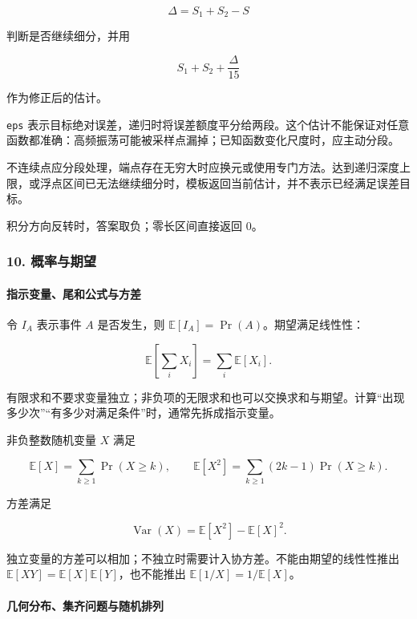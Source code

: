\[
\Delta=S_1+S_2-S
\]

判断是否继续细分，并用

\[
S_1+S_2+\frac{\Delta}{15}
\]

作为修正后的估计。

\passthrough{\lstinline!eps!} 表示目标绝对误差，递归时将误差额度平分给两段。这个估计不能保证对任意函数都准确：高频振荡可能被采样点漏掉；已知函数变化尺度时，应主动分段。

不连续点应分段处理，端点存在无穷大时应换元或使用专门方法。达到递归深度上限，或浮点区间已无法继续细分时，模板返回当前估计，并不表示已经满足误差目标。

积分方向反转时，答案取负；零长区间直接返回 \(0\)。

\hypertarget{ux6982ux7387ux4e0eux671fux671b}{%
\subsubsection{10. 概率与期望}\label{ux6982ux7387ux4e0eux671fux671b}}

\hypertarget{ux6307ux793aux53d8ux91cfux5c3eux548cux516cux5f0fux4e0eux65b9ux5dee}{%
\paragraph{指示变量、尾和公式与方差}\label{ux6307ux793aux53d8ux91cfux5c3eux548cux516cux5f0fux4e0eux65b9ux5dee}}

令 \(I_A\) 表示事件 \(A\) 是否发生，则 \(\mathbb E[I_A]=\Pr(A)\)。期望满足线性性：

\[
\mathbb E\!\left[\sum_i X_i\right]=\sum_i\mathbb E[X_i].
\]

有限求和不要求变量独立；非负项的无限求和也可以交换求和与期望。计算``出现多少次''``有多少对满足条件''时，通常先拆成指示变量。

非负整数随机变量 \(X\) 满足

\[
\mathbb E[X]=\sum_{k\ge1}\Pr(X\ge k),\qquad
\mathbb E[X^2]=\sum_{k\ge1}(2k-1)\Pr(X\ge k).
\]

方差满足

\[
\operatorname{Var}(X)=\mathbb E[X^2]-\mathbb E[X]^2.
\]

独立变量的方差可以相加；不独立时需要计入协方差。不能由期望的线性性推出 \(\mathbb E[XY]=\mathbb E[X]\mathbb E[Y]\)，也不能推出 \(\mathbb E[1/X]=1/\mathbb E[X]\)。

\hypertarget{ux51e0ux4f55ux5206ux5e03ux96c6ux9f50ux95eeux9898ux4e0eux968fux673aux6392ux5217}{%
\paragraph{几何分布、集齐问题与随机排列}\label{ux51e0ux4f55ux5206ux5e03ux96c6ux9f50ux95eeux9898ux4e0eux968fux673aux6392ux5217}}


